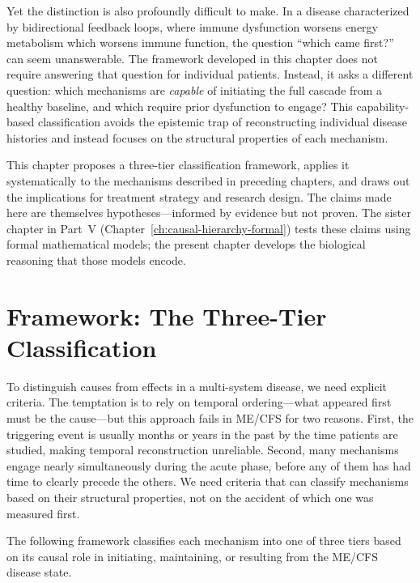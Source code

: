 Yet the distinction is also profoundly difficult to make. In a disease characterized by bidirectional feedback loops, where immune dysfunction worsens energy metabolism which worsens immune function, the question ``which came first?'' can seem unanswerable. The framework developed in this chapter does not require answering that question for individual patients. Instead, it asks a different question: which mechanisms are \emph{capable} of initiating the full cascade from a healthy baseline, and which require prior dysfunction to engage? This capability-based classification avoids the epistemic trap of reconstructing individual disease histories and instead focuses on the structural properties of each mechanism.

This chapter proposes a three-tier classification framework, applies it systematically to the mechanisms described in preceding chapters, and draws out the implications for treatment strategy and research design. The claims made here are themselves hypotheses---informed by evidence but not proven. The sister chapter in Part~V (Chapter~\ref{ch:causal-hierarchy-formal}) tests these claims using formal mathematical models; the present chapter develops the biological reasoning that those models encode.



\section{Framework: The Three-Tier Classification}
\label{sec:three-tier-framework}

To distinguish causes from effects in a multi-system disease, we need explicit criteria. The temptation is to rely on temporal ordering---what appeared first must be the cause---but this approach fails in ME/CFS for two reasons. First, the triggering event is usually months or years in the past by the time patients are studied, making temporal reconstruction unreliable. Second, many mechanisms engage nearly simultaneously during the acute phase, before any of them has had time to clearly precede the others. We need criteria that can classify mechanisms based on their structural properties, not on the accident of which one was measured first.

The following framework classifies each mechanism into one of three tiers based on its causal role in initiating, maintaining, or resulting from the ME/CFS disease state.

